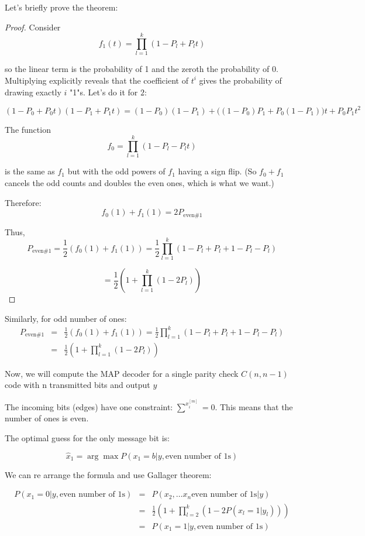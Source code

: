 Let's briefly prove the theorem: 

\begin{proof}[Proof]
	Consider
\[
  f_1(t) = \prod_{l=1}^{k}(1 - P_l + P_l t)
\]

so the linear term is the probability of 1 and the zeroth the probability of 0. Multiplying explicitly reveals that the coefficient of $t^i$ gives the probability of drawing exactly $i$ "1"s. Let's do it for $2$:

\[
(1 - P_0 + P_0 t)(1 - P_1 + P_1 t)
= (1 - P_0)(1 - P_1) + \bigl((1 - P_0)P_1 + P_0(1 - P_1)\bigr)t + P_0 P_1 t^2
\]


The function
\[
  f_0 = \prod_{l=1}^{k}(1 - P_l - P_l t)
\]

is the same as $f_1$ but with the odd powers of $f_1$ having a sign flip. (So $f_0 + f_1$ cancels the odd counts and doubles the even ones, which is what we want.)

Therefore:
\[
  f_0(1) + f_1(1) = 2P_{\text{even} \#1}
\]

Thus,
\[
  P_{\text{even} \#1} = \frac{1}{2}\left(f_0(1) + f_1(1)\right) = \frac{1}{2}\prod_{l=1}^{k}(1 - P_l + P_l + 1 - P_l - P_l)
\]

\[
= \frac{1}{2}\left(1 + \prod_{l=1}^{k}(1 - 2P_l)\right)
\]
\end{proof}

Similarly, for odd number of ones:
\begin{eqnarray}
	P_{\text{even} \#1} &=& \frac{1}{2}\left(f_0(1) + f_1(1)\right) = \frac{1}{2}\prod_{l=1}^{k}(1 - P_l + P_l + 1 - P_l - P_l) \nonumber \\
	&=& \frac{1}{2}\left(1 + \prod_{l=1}^{k}(1 - 2P_l)\right)
\end{eqnarray}

Now, we will compute the MAP decoder for a single parity check $C(n, n-1)$ code with n transmitted bits and output $y$

The incoming bits (edges) have one constraint: $\sum^{x^{[m]}_i} = 0$. This means that the number of ones is even.

The optimal guess for the only message bit is:

\begin{equation}
	\hat{x}_1 = \arg \max P(x_1=b|y, \text{even number of 1s})
\end{equation}

We can re arrange the formula and use Gallager theorem:

\begin{eqnarray}
	P(x_1=0|y, \text{even number of 1s}) &=& P(x_2, \dots x_n  \text{even number of 1s}| y) \nonumber \\
	&=& \frac{1}{2}\left(1 + \prod_{l=2}^{k}(1 - 2P(x_l=1|y_l))\right) \nonumber \\
	&=& P(x_1=1|y, \text{even number of 1s})
\end{eqnarray}


